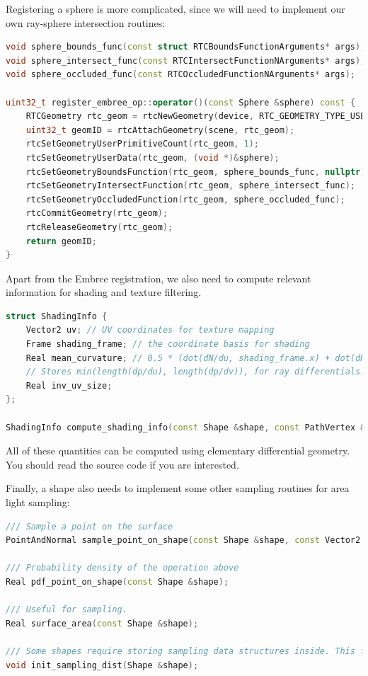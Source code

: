 Registering a sphere is more complicated, since we will need to implement our own ray-sphere intersection routines:
\begin{lstlisting}[language=c++]
void sphere_bounds_func(const struct RTCBoundsFunctionArguments* args);
void sphere_intersect_func(const RTCIntersectFunctionNArguments* args);
void sphere_occluded_func(const RTCOccludedFunctionNArguments* args);

uint32_t register_embree_op::operator()(const Sphere &sphere) const {
    RTCGeometry rtc_geom = rtcNewGeometry(device, RTC_GEOMETRY_TYPE_USER);
    uint32_t geomID = rtcAttachGeometry(scene, rtc_geom);
    rtcSetGeometryUserPrimitiveCount(rtc_geom, 1);
    rtcSetGeometryUserData(rtc_geom, (void *)&sphere);
    rtcSetGeometryBoundsFunction(rtc_geom, sphere_bounds_func, nullptr);
    rtcSetGeometryIntersectFunction(rtc_geom, sphere_intersect_func);
    rtcSetGeometryOccludedFunction(rtc_geom, sphere_occluded_func);
    rtcCommitGeometry(rtc_geom);
    rtcReleaseGeometry(rtc_geom);
    return geomID;
}
\end{lstlisting}

Apart from the Embree registration, we also need to compute relevant information for shading and texture filtering.
\begin{lstlisting}[language=c++]
struct ShadingInfo {
    Vector2 uv; // UV coordinates for texture mapping
    Frame shading_frame; // the coordinate basis for shading
    Real mean_curvature; // 0.5 * (dot(dN/du, shading_frame.x) + dot(dN/dv, shading_frame.y))
    // Stores min(length(dp/du), length(dp/dv)), for ray differentials.
    Real inv_uv_size;
};

ShadingInfo compute_shading_info(const Shape &shape, const PathVertex &vertex);
\end{lstlisting}
All of these quantities can be computed using elementary differential geometry. You should read the source code if you are interested.

Finally, a shape also needs to implement some other sampling routines for area light sampling:
\begin{lstlisting}[language=c++]
/// Sample a point on the surface
PointAndNormal sample_point_on_shape(const Shape &shape, const Vector2 &uv, Real w);

/// Probability density of the operation above
Real pdf_point_on_shape(const Shape &shape);

/// Useful for sampling.
Real surface_area(const Shape &shape);

/// Some shapes require storing sampling data structures inside. This function initialize them.
void init_sampling_dist(Shape &shape);
\end{lstlisting}

